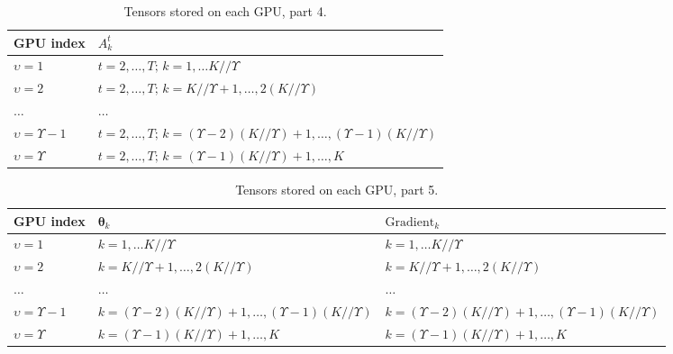 \documentclass{article}
\begin{document}
\begin{table}[hbt!]
\caption{Tensors stored on each GPU, part 4.}
\begin{tabular}{l|l}
GPU index & $A_k^t$ \\ \midrule
$\upsilon=1$ & $t=2,\dots,T;\, k=1,\dots K//\Upsilon$ \\
$\upsilon=2$ & $t=2,\dots,T;\, k=K//\Upsilon+1,\dots,2(K//\Upsilon)$ \\
$\dots$ & $\dots$\\
$\upsilon=\Upsilon-1$ & $t=2,\dots,T;\, k=(\Upsilon-2)(K//\Upsilon)+1,\dots,(\Upsilon-1)(K//\Upsilon)$ \\
$\upsilon=\Upsilon$ & $t=2,\dots,T;\, k=(\Upsilon-1)(K//\Upsilon)+1,\dots,K$
\end{tabular}
\label{tab:dist4}
\end{table}

\begin{table}[hbt!]
\caption{Tensors stored on each GPU, part 5.}
\begin{tabular}{l|ll}
GPU index & $\boldsymbol{\theta}_k$ & $\mathrm{Gradient}_k$\\ \midrule
$\upsilon=1$ & $k=1,\dots K//\Upsilon$ & $k=1,\dots K//\Upsilon$ \\
$\upsilon=2$ & $k=K//\Upsilon+1,\dots,2(K//\Upsilon)$ & $k=K//\Upsilon+1,\dots,2(K//\Upsilon)$ \\
$\dots$ & $\dots$ & $\dots$\\
$\upsilon=\Upsilon-1$ & $k=(\Upsilon-2)(K//\Upsilon)+1,\dots,(\Upsilon-1)(K//\Upsilon)$ & $k=(\Upsilon-2)(K//\Upsilon)+1,\dots,(\Upsilon-1)(K//\Upsilon)$ \\
$\upsilon=\Upsilon$ & $k=(\Upsilon-1)(K//\Upsilon)+1,\dots,K$ & $k=(\Upsilon-1)(K//\Upsilon)+1,\dots,K$              
\end{tabular}
\label{tab:dist5}
\end{table}
\end{document}
